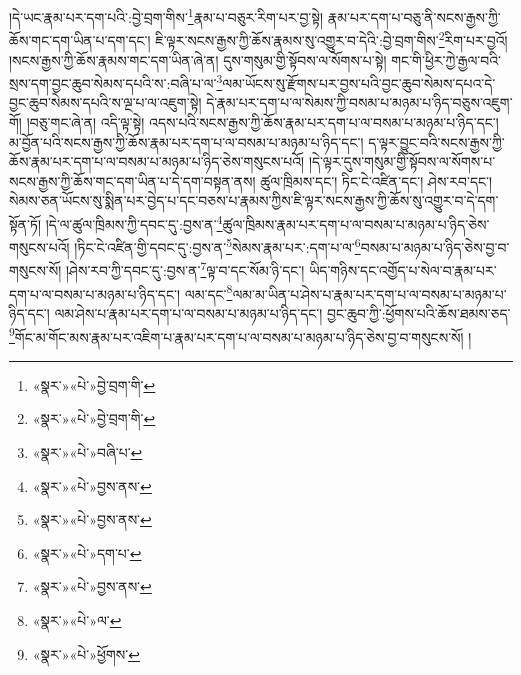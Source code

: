 །དེ་ཡང་རྣམ་པར་དག་པའི་:བྱེ་བྲག་གིས་\footnote{«སྣར་»«པེ་»བྱེ་བྲག་གི་}རྣམ་པ་བཅུར་རིག་པར་བྱ་སྟེ། རྣམ་པར་དག་པ་བཅུ་ནི་སངས་རྒྱས་ཀྱི་ཆོས་གང་དག་ཡིན་པ་དག་དང་། ཇི་ལྟར་སངས་རྒྱས་ཀྱི་ཆོས་རྣམས་སུ་འགྱུར་བ་དེའི་:བྱེ་བྲག་གིས་\footnote{«སྣར་»«པེ་»བྱེ་བྲག་གི་}རིག་པར་བྱའོ། །སངས་རྒྱས་ཀྱི་ཆོས་རྣམས་གང་དག་ཡིན་ཞེ་ན། དུས་གསུམ་གྱི་སྟོབས་ལ་སོགས་པ་སྟེ། གང་གི་ཕྱིར་ཀྱེ་རྒྱལ་བའི་སྲས་དག་བྱང་ཆུབ་སེམས་དཔའི་ས་:བཞི་པ་ལ་\footnote{«སྣར་»«པེ་»བཞི་པ་}ལམ་ཡོངས་སུ་རྫོགས་པར་བྱས་པའི་བྱང་ཆུབ་སེམས་དཔའ་དེ་བྱང་ཆུབ་སེམས་དཔའི་ས་ལྔ་པ་ལ་འཇུག་སྟེ། དེ་རྣམ་པར་དག་པ་ལ་སེམས་ཀྱི་བསམ་པ་མཉམ་པ་ཉིད་བཅུས་འཇུག་གོ། །བཅུ་གང་ཞེ་ན། འདི་ལྟ་སྟེ། འདས་པའི་སངས་རྒྱས་ཀྱི་ཆོས་རྣམ་པར་དག་པ་ལ་བསམ་པ་མཉམ་པ་ཉིད་དང་། མ་བྱོན་པའི་སངས་རྒྱས་ཀྱི་ཆོས་རྣམ་པར་དག་པ་ལ་བསམ་པ་མཉམ་པ་ཉིད་དང་། ད་ལྟར་བྱུང་བའི་སངས་རྒྱས་ཀྱི་ཆོས་རྣམ་པར་དག་པ་ལ་བསམ་པ་མཉམ་པ་ཉིད་ཅེས་གསུངས་པའོ། །དེ་ལྟར་དུས་གསུམ་གྱི་སྟོབས་ལ་སོགས་པ་སངས་རྒྱས་ཀྱི་ཆོས་གང་དག་ཡིན་པ་དེ་དག་བསྟན་ནས། ཚུལ་ཁྲིམས་དང་། ཏིང་ངེ་འཛིན་དང་། ཤེས་རབ་དང་། སེམས་ཅན་ཡོངས་སུ་སྨིན་པར་བྱེད་པ་དང་བཅས་པ་རྣམས་ཀྱིས་ཇི་ལྟར་སངས་རྒྱས་ཀྱི་ཆོས་སུ་འགྱུར་བ་དེ་དག་སྟོན་ཏོ། །དེ་ལ་ཚུལ་ཁྲིམས་ཀྱི་དབང་དུ་:བྱས་ན་\footnote{«སྣར་»«པེ་»བྱས་ནས་}ཚུལ་ཁྲིམས་རྣམ་པར་དག་པ་ལ་བསམ་པ་མཉམ་པ་ཉིད་ཅེས་གསུངས་པའོ། །ཏིང་ངེ་འཛིན་གྱི་དབང་དུ་:བྱས་ན་\footnote{«སྣར་»«པེ་»བྱས་ནས་}སེམས་རྣམ་པར་:དག་པ་ལ་\footnote{«སྣར་»«པེ་»དག་པ་}བསམ་པ་མཉམ་པ་ཉིད་ཅེས་བྱ་བ་གསུངས་སོ། །ཤེས་རབ་ཀྱི་དབང་དུ་:བྱས་ན་\footnote{«སྣར་»«པེ་»བྱས་ནས་}ལྟ་བ་དང་སོམ་ཉི་དང་། ཡིད་གཉིས་དང་འགྱོད་པ་སེལ་བ་རྣམ་པར་དག་པ་ལ་བསམ་པ་མཉམ་པ་ཉིད་དང་། ལམ་དང་\footnote{«སྣར་»«པེ་»ལ་}ལམ་མ་ཡིན་པ་ཤེས་པ་རྣམ་པར་དག་པ་ལ་བསམ་པ་མཉམ་པ་ཉིད་དང་། ལམ་ཤེས་པ་རྣམ་པར་དག་པ་ལ་བསམ་པ་མཉམ་པ་ཉིད་དང་། བྱང་ཆུབ་ཀྱི་:ཕྱོགས་པའི་ཆོས་ཐམས་ཅད་\footnote{«སྣར་»«པེ་»ཕྱོགས་}གོང་མ་གོང་མས་རྣམ་པར་འཇིག་པ་རྣམ་པར་དག་པ་ལ་བསམ་པ་མཉམ་པ་ཉིད་ཅེས་བྱ་བ་གསུངས་སོ། །
